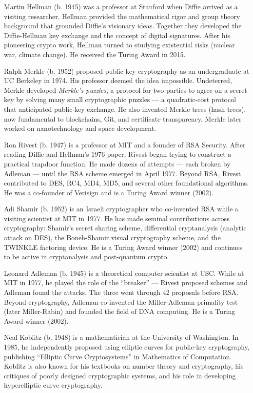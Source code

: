 Martin Hellman (b. 1945) was a professor at Stanford when Diffie arrived as a visiting researcher. Hellman provided the mathematical rigor and group theory background that grounded Diffie's visionary ideas. Together they developed the Diffie-Hellman key exchange and the concept of digital signatures. After his pioneering crypto work, Hellman turned to studying existential risks (nuclear war, climate change). He received the Turing Award in 2015.

Ralph Merkle (b. 1952) proposed public-key cryptography as an undergraduate at UC Berkeley in 1974. His professor deemed the idea impossible. Undeterred, Merkle developed \emph{Merkle's puzzles}, a protocol for two parties to agree on a secret key by solving many small cryptographic puzzles — a quadratic-cost protocol that anticipated public-key exchange. He also invented Merkle trees (hash trees), now fundamental to blockchains, Git, and certificate transparency. Merkle later worked on nanotechnology and space development.

Ron Rivest (b. 1947) is a professor at MIT and a founder of RSA Security. After reading Diffie and Hellman's 1976 paper, Rivest began trying to construct a practical trapdoor function. He made dozens of attempts — each broken by Adleman — until the RSA scheme emerged in April 1977. Beyond RSA, Rivest contributed to DES, RC4, MD4, MD5, and several other foundational algorithms. He was a co-founder of Verisign and is a Turing Award winner (2002).

Adi Shamir (b. 1952) is an Israeli cryptographer who co-invented RSA while a visiting scientist at MIT in 1977. He has made seminal contributions across cryptography: Shamir's secret sharing scheme, differential cryptanalysis (analytic attack on DES), the Boneh-Shamir visual cryptography scheme, and the TWINKLE factoring device. He is a Turing Award winner (2002) and continues to be active in cryptanalysis and post-quantum crypto.

Leonard Adleman (b. 1945) is a theoretical computer scientist at USC. While at MIT in 1977, he played the role of the ``breaker'' — Rivest proposed schemes and Adleman found the attacks. The three went through 42 proposals before RSA. Beyond cryptography, Adleman co-invented the Miller-Adleman primality test (later Miller-Rabin) and founded the field of DNA computing. He is a Turing Award winner (2002).

Neal Koblitz (b. 1948) is a mathematician at the University of Washington. In 1985, he independently proposed using elliptic curves for public-key cryptography, publishing ``Elliptic Curve Cryptosystems'' in Mathematics of Computation. Koblitz is also known for his textbooks on number theory and cryptography, his critiques of poorly designed cryptographic systems, and his role in developing hyperelliptic curve cryptography.


